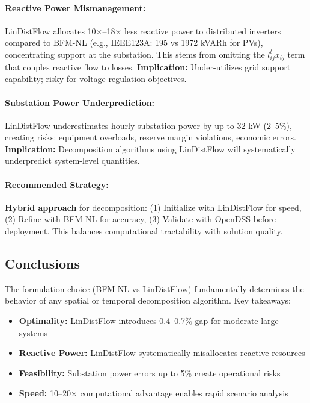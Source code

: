 \paragraph{Reactive Power Mismanagement:} LinDistFlow allocates 10×–18× less reactive power to distributed inverters compared to BFM-NL (e.g., IEEE123A: 195 vs 1972 kVARh for PVs), concentrating support at the substation. This stems from omitting the $l_{ij}^t x_{ij}$ term that couples reactive flow to losses. \textbf{Implication:} Under-utilizes grid support capability; risky for voltage regulation objectives.

\paragraph{Substation Power Underprediction:} LinDistFlow underestimates hourly substation power by up to 32 kW (2–5\%), creating risks: equipment overloads, reserve margin violations, economic errors. \textbf{Implication:} Decomposition algorithms using LinDistFlow will systematically underpredict system-level quantities.

\paragraph{Recommended Strategy:} \textbf{Hybrid approach} for decomposition: (1) Initialize with LinDistFlow for speed, (2) Refine with BFM-NL for accuracy, (3) Validate with OpenDSS before deployment. This balances computational tractability with solution quality.

\subsection{Conclusions}

The formulation choice (BFM-NL vs LinDistFlow) fundamentally determines the behavior of any spatial or temporal decomposition algorithm. Key takeaways:

\begin{itemize}
    \item \textbf{Optimality:} LinDistFlow introduces 0.4–0.7\% gap for moderate-large systems
    \item \textbf{Reactive Power:} LinDistFlow systematically misallocates reactive resources
    \item \textbf{Feasibility:} Substation power errors up to 5\% create operational risks
    \item \textbf{Speed:} 10–20× computational advantage enables rapid scenario analysis
\end{itemize}

